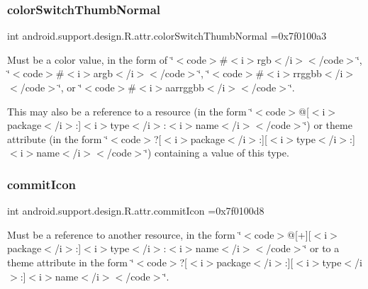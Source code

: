 \subsubsection{\texorpdfstring{color\+Switch\+Thumb\+Normal}{colorSwitchThumbNormal}}
{\footnotesize\ttfamily int android.\+support.\+design.\+R.\+attr.\+color\+Switch\+Thumb\+Normal =0x7f0100a3\hspace{0.3cm}{\ttfamily [static]}}

Must be a color value, in the form of \char`\"{}$<$code$>$\#$<$i$>$rgb$<$/i$>$$<$/code$>$\char`\"{}, \char`\"{}$<$code$>$\#$<$i$>$argb$<$/i$>$$<$/code$>$\char`\"{}, \char`\"{}$<$code$>$\#$<$i$>$rrggbb$<$/i$>$$<$/code$>$\char`\"{}, or \char`\"{}$<$code$>$\#$<$i$>$aarrggbb$<$/i$>$$<$/code$>$\char`\"{}. 

This may also be a reference to a resource (in the form \char`\"{}$<$code$>$@\mbox{[}$<$i$>$package$<$/i$>$\+:\mbox{]}$<$i$>$type$<$/i$>$\+:$<$i$>$name$<$/i$>$$<$/code$>$\char`\"{}) or theme attribute (in the form \char`\"{}$<$code$>$?\mbox{[}$<$i$>$package$<$/i$>$\+:\mbox{]}\mbox{[}$<$i$>$type$<$/i$>$\+:\mbox{]}$<$i$>$name$<$/i$>$$<$/code$>$\char`\"{}) containing a value of this type. \mbox{\label{classandroid_1_1support_1_1design_1_1R_1_1attr_ae2e4fb1b24069509fc70fec10a60810f}} 
\subsubsection{\texorpdfstring{commit\+Icon}{commitIcon}}
{\footnotesize\ttfamily int android.\+support.\+design.\+R.\+attr.\+commit\+Icon =0x7f0100d8\hspace{0.3cm}{\ttfamily [static]}}

Must be a reference to another resource, in the form \char`\"{}$<$code$>$@\mbox{[}+\mbox{]}\mbox{[}$<$i$>$package$<$/i$>$\+:\mbox{]}$<$i$>$type$<$/i$>$\+:$<$i$>$name$<$/i$>$$<$/code$>$\char`\"{} or to a theme attribute in the form \char`\"{}$<$code$>$?\mbox{[}$<$i$>$package$<$/i$>$\+:\mbox{]}\mbox{[}$<$i$>$type$<$/i$>$\+:\mbox{]}$<$i$>$name$<$/i$>$$<$/code$>$\char`\"{}. \mbox{\label{classandroid_1_1support_1_1design_1_1R_1_1attr_a344dc4ed8f3a982023c3679ecac0347f}} 
